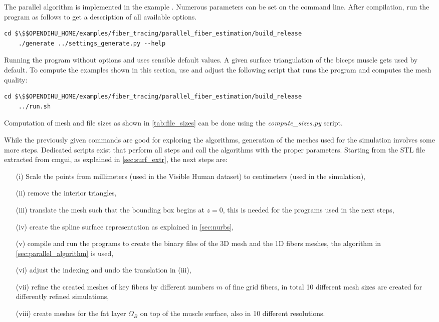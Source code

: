 \label{sec:repro_tendon_meshes}
\begin{reproduce}
  The parallel algorithm is implemented in the example . 
  Numerous parameters can be set on the command line. After compilation, run the program as follows to get a description of all available options.
  \begin{lstlisting}[columns=fullflexible,breaklines=true,postbreak=\mbox{\textcolor{gray}{$\hookrightarrow$}\space}]
    cd $\$$OPENDIHU_HOME/examples/fiber_tracing/parallel_fiber_estimation/build_release
    ./generate ../settings_generate.py --help
  \end{lstlisting}
  Running the program without options and  uses sensible default values. A given surface triangulation of the biceps muscle gets used by default. To compute the examples shown in this section, use and adjust the following script that runs the  program and computes the mesh quality:
  \begin{lstlisting}[columns=fullflexible,breaklines=true,postbreak=\mbox{\textcolor{gray}{$\hookrightarrow$}\space}]
    cd $\$$OPENDIHU_HOME/examples/fiber_tracing/parallel_fiber_estimation/build_release
    ../run.sh
  \end{lstlisting}
  Computation of mesh and file sizes as shown in \cref{tab:file_sizes} can be done using the \emph{compute\_sizes.py} script.
  
  While the previously given commands are good for exploring the algorithms, generation of the meshes used for the simulation involves some more steps. Dedicated scripts exist that perform all steps and call the algorithms with the proper parameters.
  Starting from the STL file extracted from cmgui, as explained in \cref{sec:surf_extr}, the next steps are: 
  \begin{itemize}[leftmargin=1cm]
  \item[(i)] Scale the points from millimeters (used in the Visible Human dataset) to centimeters (used in the simulation), 
  \item[(ii)] remove the interior triangles, 
  \item[(iii)] translate the mesh such that the bounding box begins at $z=0$, this is needed for the programs used in the next steps, 
  \item[(iv)] create the spline surface representation as explained in \cref{sec:nurbs}, 
  \item[(v)] compile and run the \opendihu{} programs to create the binary files of the 3D mesh and the 1D fibers meshes, the algorithm in \cref{sec:parallel_algorithm} is used, 
  \item[(vi)] adjust the indexing and undo the translation in (iii), \item[(vii)] refine the created meshes of key fibers by different numbers $m$ of fine grid fibers, in total 10 different mesh sizes are created for differently refined simulations, 
  \item[(viii)] create meshes for the fat layer $\Omega_B$ on top of the muscle surface, also in 10 different resolutions.
  \end{itemize}
  

\end{reproduce}
